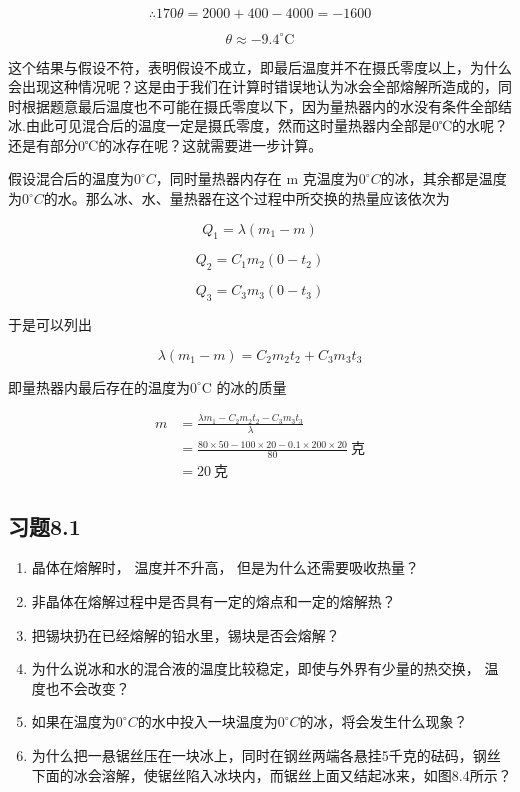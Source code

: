 \[
\therefore 170 \theta = 2000 + 400 - 4000 = - 1600
\]

\[
\theta\approx-9.4^\circ\mathrm{C}
\]

这个结果与假设不符，表明假设不成立，即最后温度并不在摄氏零度以上，为什么会出现这种情况呢？这是由于我们在计算时错误地认为冰会全部熔解所造成的，同时根据题意最后温度也不可能在摄氏零度以下，因为量热器内的水没有条件全部结冰.由此可见混合后的温度一定是摄氏零度，然而这时量热器内全部是0℃的水呢？还是有部分0℃的冰存在呢？这就需要进一步计算。

假设混合后的温度为\(0^{\circ}C\)，同时量热器内存在 m
克温度为\(0^{\circ}C\)的冰，其余都是温度为\(0^{\circ}C\)的水。那么冰、水、量热器在这个过程中所交换的热量应该依次为

\[
Q _ {1} = \lambda (m _ {1} - m)
\]

\[
Q _ {2} = C _ {1} m _ {2} (0 - t _ {2})
\]

\[
Q_3=C_3m_3(0-t_3)
\]

于是可以列出

\[
\lambda(m_1-m)=C_2m_2t_2+C_3m_3t_3
\]

即量热器内最后存在的温度为\(0^{\circ}\)C 的冰的质量

\[
\begin{aligned}m&=\frac{\lambda m_1-C_2m_2t_2-C_3m_3t_3}{\lambda}\\&=\frac{80\times50-100\times20-0.1\times200\times20}{80}\ \text{克}\\&=20\ \text{克}\end{aligned}
\]

\subsection{习题8.1}\label{ux4e60ux98988.1}

\begin{enumerate}
\def\labelenumi{\arabic{enumi}.}
\item
  晶体在熔解时， 温度并不升高， 但是为什么还需要吸收热量？
\item
  非晶体在熔解过程中是否具有一定的熔点和一定的熔解热？
\item
  把锡块扔在已经熔解的铅水里，锡块是否会熔解？
\item
  为什么说冰和水的混合液的温度比较稳定，即使与外界有少量的热交换，
  温度也不会改变？
\item
  如果在温度为\(0^{\circ}C\)的水中投入一块温度为\(0^{\circ}C\)的冰，将会发生什么现象？
\item
  为什么把一悬锯丝压在一块冰上，同时在钢丝两端各悬挂5千克的砝码，钢丝下面的冰会溶解，使锯丝陷入冰块内，而锯丝上面又结起冰来，如图8.4所示？
\end{enumerate}

